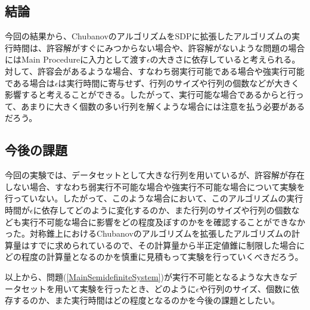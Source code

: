 \subsection{結論}
今回の結果から、ChubanovのアルゴリズムをSDPに拡張したアルゴリズムの実行時間は、許容解がすぐにみつからない場合や、許容解がないような問題の場合にはMain Procedureに入力として渡す$\epsilon$の大きさに依存していると考えられる。対して、許容会があるような場合、すなわち弱実行可能である場合や強実行可能である場合は$\epsilon$は実行時間に寄与せず、行列のサイズや行列の個数などが大きく影響すると考えることができる。したがって、実行可能な場合であるからと行って、あまりに大きく個数の多い行列を解くような場合には注意を払う必要があるだろう。

\subsection{今後の課題}
今回の実験では、データセットとして大きな行列を用いているが、許容解が存在しない場合、すなわち弱実行不可能な場合や強実行不可能な場合について実験を行っていない。したがって、このような場合において、このアルゴリズムの実行時間が$\epsilon$に依存してどのように変化するのか、また行列のサイズや行列の個数なども実行不可能な場合に影響をどの程度及ぼすのかをを確認することができなかった。対称錐上におけるChubanovのアルゴリズムを拡張したアルゴリズムの計算量はすでに求められているので、その計算量から半正定値錐に制限した場合にどの程度の計算量となるのかを慎重に見積もって実験を行っていくべきだろう。

以上から、問題(\ref{MainSemidefiniteSystem})が実行不可能となるような大きなデータセットを用いて実験を行ったとき、どのように$\epsilon$や行列のサイズ、個数に依存するのか、また実行時間はどの程度となるのかを今後の課題としたい。
